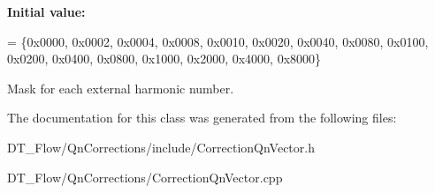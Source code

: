 {\bfseries Initial value\+:}
\begin{DoxyCode}
=
    \{0x0000, 0x0002, 0x0004, 0x0008, 0x0010, 0x0020, 0x0040, 0x0080,
     0x0100, 0x0200, 0x0400, 0x0800, 0x1000, 0x2000, 0x4000, 0x8000\}
\end{DoxyCode}


Mask for each external harmonic number. 



The documentation for this class was generated from the following files\+:\begin{DoxyCompactItemize}
\item 
D\+T\+\_\+\+Flow/\+Qn\+Corrections/include/Correction\+Qn\+Vector.\+h\item 
D\+T\+\_\+\+Flow/\+Qn\+Corrections/Correction\+Qn\+Vector.\+cpp\end{DoxyCompactItemize}
